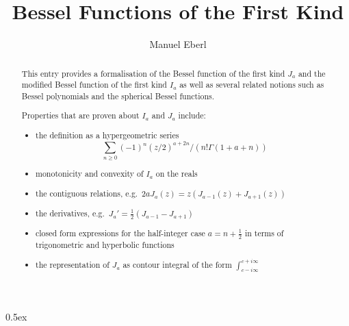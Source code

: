 \documentclass[11pt,a4paper]{article}
\begin{document}
\title{Bessel Functions of the First Kind}
\author{Manuel Eberl}
\maketitle

\begin{abstract}
This entry provides a formalisation of the Bessel function of the first kind $J_a$ and the 
modified Bessel function of the first kind $I_a$ as well as several related notions such as 
Bessel polynomials and the spherical Bessel functions.

Properties that are proven about $I_a$ and $J_a$ include:
\begin{itemize}
	\item the definition as a hypergeometric series \[\sum_{n\geq 0} (-1)^n (z/2)^{a+2n} / (n! \Gamma(1+a+n))\]
  \item monotonicity and convexity of $I_a$ on the reals
  \item the contiguous relations, e.g.\ $2 a J_a(z) = z (J_{a-1}(z) + J_{a+1}(z))$
  \item the derivatives, e.g.\ $J_a' = \frac{1}{2} (J_{a-1} - J_{a+1})$
  \item closed form expressions for the half-integer case $a = n + \frac{1}{2}$ in terms of
        trigonometric and hyperbolic functions
  \item the representation of $J_a$ as contour integral of the form $\int_{c-i\infty}^{c+i\infty}$
\end{itemize}
\end{abstract}

\tableofcontents

\newpage
\parindent 0pt\parskip 0.5ex



\raggedright
\nocite{nist}



\end{document}
